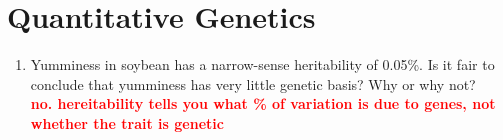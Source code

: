 \documentclass[]{article}
\newcommand{\answer}[1]{\textcolor{red}{\bf #1}}
\begin{document}
\section*{Quantitative Genetics}
\begin{enumerate}
\item Yumminess in soybean has a narrow-sense heritability of 0.05\%.  Is it fair to conclude that yumminess has very little genetic basis?  Why or why not? \\
\answer{no. hereitability tells you what \% of variation is due to genes, not whether the trait is genetic}
\end{enumerate}
\end{document}
